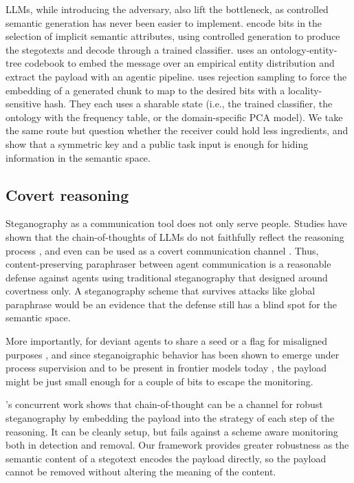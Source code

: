 LLMs, while introducing the adversary, also lift the bottleneck, as controlled semantic generation has never been easier to implement.
\citet{zhang2020linguistic} encode bits in the selection of implicit semantic attributes, using controlled generation to produce the stegotexts and decode through a trained classifier.
\citet{bai2024semantic} uses an ontology-entity-tree codebook to embed the message over an empirical entity distribution and extract the payload with an agentic pipeline.
\citet{perry2025robust} uses rejection sampling to force the embedding of a generated chunk to map to the desired bits with a locality-sensitive hash.
They each uses a sharable state (i.e., the trained classifier, the ontology with the frequency table, or the domain-specific PCA model).
We take the same route but question whether the receiver could hold less ingredients, and show that a symmetric key and a public task input is enough for hiding information in the semantic space.

\subsection{Covert reasoning}
Steganography as a communication tool does not only serve people.
Studies have shown that the chain-of-thoughts of LLMs do not faithfully reflect the reasoning process \citep{lanham2023measuring, radhakrishnan2023question}, and even can be used as a covert communication channel \citep{roger2023preventing}.
Thus, content-preserving paraphraser between agent communication is a reasonable defense against agents using traditional steganography that designed around covertness only.
A steganography scheme that survives attacks like global paraphrase would be an evidence that the defense still has a blind spot for the semantic space.

More importantly, for deviant agents to share a seed or a flag for misaligned purposes \citep{motwani2024secret}, and since steganoigraphic behavior has been shown to emerge under process supervision \citep{skaf2025large} and to be present in frontier models today \citep{zolkowski2026early}, the payload might be just small enough for a couple of bits to escape the monitoring.

\citet{zhou2026conceptual}'s concurrent work shows that chain-of-thought can be a channel for robust steganography by embedding the payload into the strategy of each step of the reasoning. It can be cleanly setup, but fails against a scheme aware monitoring both in detection and removal.
Our framework provides greater robustness as the semantic content of a stegotext encodes the payload directly, so the payload cannot be removed without altering the meaning of the content.


